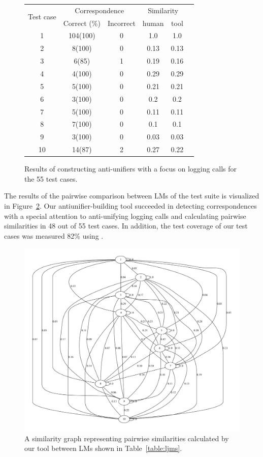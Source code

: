 \begin{figure}
  \centering
  \begin{tabular}{|c|c|c|c|c|c|}
    \hline
    \multirow{2}{*}{Test case}&\multicolumn{2}{c|}{Correspondence}&\multicolumn{2}{c|}{Similarity}\\
    \cline{2-5}
    &Correct (\%)&Incorrect&human&tool\\
    \hline
    1&104(100)&0& 1.0 & 1.0\\
    \hline
    2&8(100)&0& 0.13& 0.13\\
    \hline
    3&6(85)&1&0.19& 0.16\\
    \hline
    4&4(100)&0&0.29 &0.29\\
    \hline
    5&5(100)&0&0.21 &0.21\\
    \hline
    6&3(100)&0&0.2 &0.2\\
    \hline
    7&5(100)&0&0.11 &0.11\\
    \hline
    8&7(100)&0& 0.1&0.1\\
    \hline
    9&3(100)&0&0.03&0.03 \\
    \hline
    10&14(87)&2&0.27 &0.22\\
    \hline

  \end{tabular}
  \caption{Results of constructing anti-unifiers with a focus on logging calls for the 55 test cases.}
  \label{study2_test_cases_results}
\end{figure}

The results of the pairwise comparison between LMs of the test suite is visualized in Figure~\ref{fig:au_graph}. Our antiunifier-building tool succeeded in detecting correspondences with a special attention to anti-unifying logging calls and calculating pairwise similarities in 48 out of 55 test cases. In addition, the test coverage of our test cases was measured 82\% using .

\begin{figure} [H]
  \centering\includegraphics [width = \textwidth]{graphviz/au.pdf}
  \caption{A similarity graph representing pairwise similarities calculated by our tool between LMs shown in Table~\ref{table:ljms}.}
  \label{fig:au_graph}
\end{figure}

